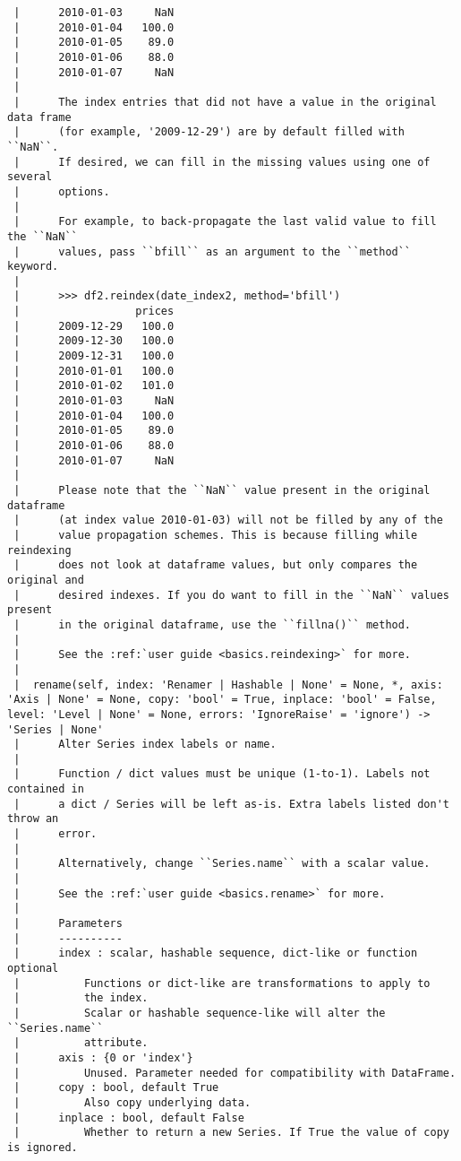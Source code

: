 \documentclass[
  letterpaper,
  DIV=11,
  numbers=noendperiod]{scrreprt}
\begin{document}
\begin{verbatim}
 |      2010-01-03     NaN
 |      2010-01-04   100.0
 |      2010-01-05    89.0
 |      2010-01-06    88.0
 |      2010-01-07     NaN
 |      
 |      The index entries that did not have a value in the original data frame
 |      (for example, '2009-12-29') are by default filled with ``NaN``.
 |      If desired, we can fill in the missing values using one of several
 |      options.
 |      
 |      For example, to back-propagate the last valid value to fill the ``NaN``
 |      values, pass ``bfill`` as an argument to the ``method`` keyword.
 |      
 |      >>> df2.reindex(date_index2, method='bfill')
 |                  prices
 |      2009-12-29   100.0
 |      2009-12-30   100.0
 |      2009-12-31   100.0
 |      2010-01-01   100.0
 |      2010-01-02   101.0
 |      2010-01-03     NaN
 |      2010-01-04   100.0
 |      2010-01-05    89.0
 |      2010-01-06    88.0
 |      2010-01-07     NaN
 |      
 |      Please note that the ``NaN`` value present in the original dataframe
 |      (at index value 2010-01-03) will not be filled by any of the
 |      value propagation schemes. This is because filling while reindexing
 |      does not look at dataframe values, but only compares the original and
 |      desired indexes. If you do want to fill in the ``NaN`` values present
 |      in the original dataframe, use the ``fillna()`` method.
 |      
 |      See the :ref:`user guide <basics.reindexing>` for more.
 |  
 |  rename(self, index: 'Renamer | Hashable | None' = None, *, axis: 'Axis | None' = None, copy: 'bool' = True, inplace: 'bool' = False, level: 'Level | None' = None, errors: 'IgnoreRaise' = 'ignore') -> 'Series | None'
 |      Alter Series index labels or name.
 |      
 |      Function / dict values must be unique (1-to-1). Labels not contained in
 |      a dict / Series will be left as-is. Extra labels listed don't throw an
 |      error.
 |      
 |      Alternatively, change ``Series.name`` with a scalar value.
 |      
 |      See the :ref:`user guide <basics.rename>` for more.
 |      
 |      Parameters
 |      ----------
 |      index : scalar, hashable sequence, dict-like or function optional
 |          Functions or dict-like are transformations to apply to
 |          the index.
 |          Scalar or hashable sequence-like will alter the ``Series.name``
 |          attribute.
 |      axis : {0 or 'index'}
 |          Unused. Parameter needed for compatibility with DataFrame.
 |      copy : bool, default True
 |          Also copy underlying data.
 |      inplace : bool, default False
 |          Whether to return a new Series. If True the value of copy is ignored.

\end{verbatim}
\end{document}
